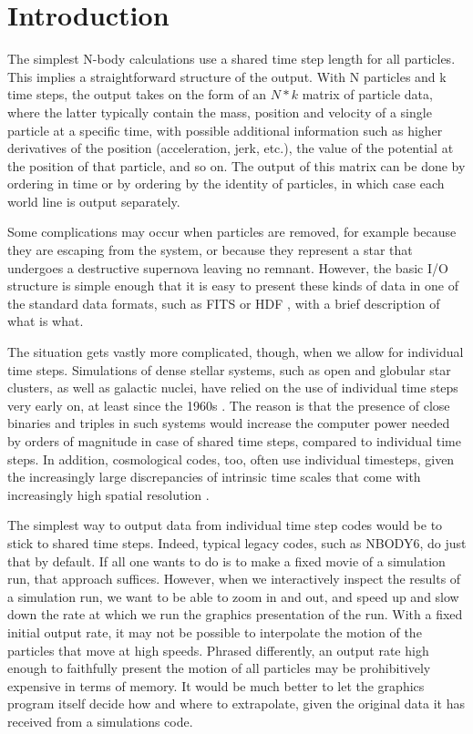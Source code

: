 \documentclass[5p,authoryear]{elsarticle}
\begin{document}
\section{Introduction}

The simplest N-body calculations use a shared time step length for all
particles.  This implies a straightforward structure of the output.
With N particles and k time steps, the output takes on the form of an
$N*k$ matrix of particle data, where the latter typically contain the
mass, position and velocity of a single particle at a specific time,
with possible additional information such as higher derivatives of the
position (acceleration, jerk, etc.), the value of the potential at the
position of that particle, and so on.  The output of this matrix can
be done by ordering in time or by ordering by the identity of
particles, in which case each world line is output separately.

Some complications may occur when particles are removed, for example
because they are escaping from the system, or because they represent a
star that undergoes a destructive supernova leaving no remnant.
However, the basic I/O structure is simple enough that it is easy to
present these kinds of data in one of the standard data formats, such
as FITS \citep{Pence2010} or HDF \citep{HDF2011}, with a brief
description of what is what.

The situation gets vastly more complicated, though, when we allow for
individual time steps.  Simulations of dense stellar systems, such as
open and globular star clusters, as well as galactic nuclei, have
relied on the use of individual time steps very early on, at least
since the 1960s \citep{Aarseth2009}.  The reason is that the presence
of close binaries and triples in such systems would increase the
computer power needed by orders of magnitude in case of shared time
steps, compared to individual time steps.  In addition, cosmological
codes, too, often use individual timesteps, given the increasingly
large discrepancies of intrinsic time scales that come with
increasingly high spatial resolution \citep[e.g.][]{Springel2005}.

The simplest way to output data from individual time step codes would
be to stick to shared time steps.  Indeed, typical legacy codes, such
as NBODY6, do just that by default.  If all one wants to do is to make
a fixed movie of a simulation run, that approach suffices.  However,
when we interactively inspect the results of a simulation run, we want
to be able to zoom in and out, and speed up and slow down the rate at
which we run the graphics presentation of the run.  With a fixed
initial output rate, it may not be possible to interpolate the motion
of the particles that move at high speeds.  Phrased differently, an
output rate high enough to faithfully present the motion of all
particles may be prohibitively expensive in terms of memory.  It would
be much better to let the graphics program itself decide how and where
to extrapolate, given the original data it has received from a
simulations code.
\end{document}
